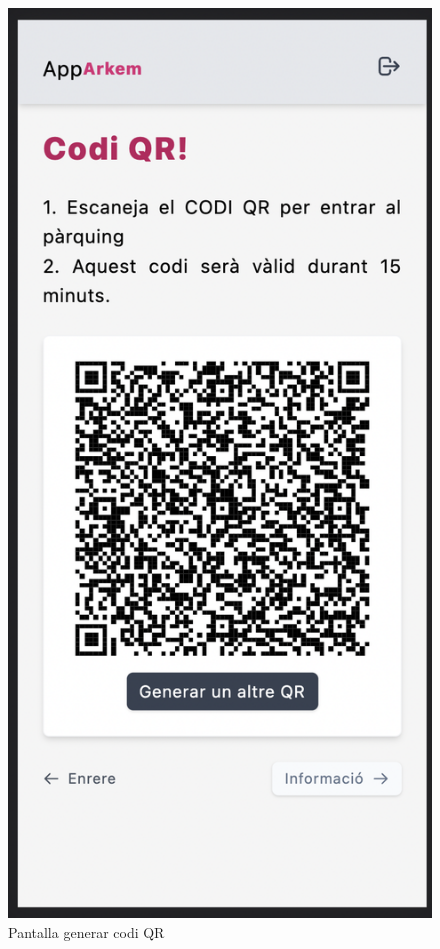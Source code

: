\begin{figure}[H]
    \begin{center}
        \includegraphics[scale=0.50]{Fotos/pantalla3_codiQR.png}
    \end{center}
    \caption{Pantalla generar codi QR}
    \label{fig:codiQR_photo}
\end{figure}

